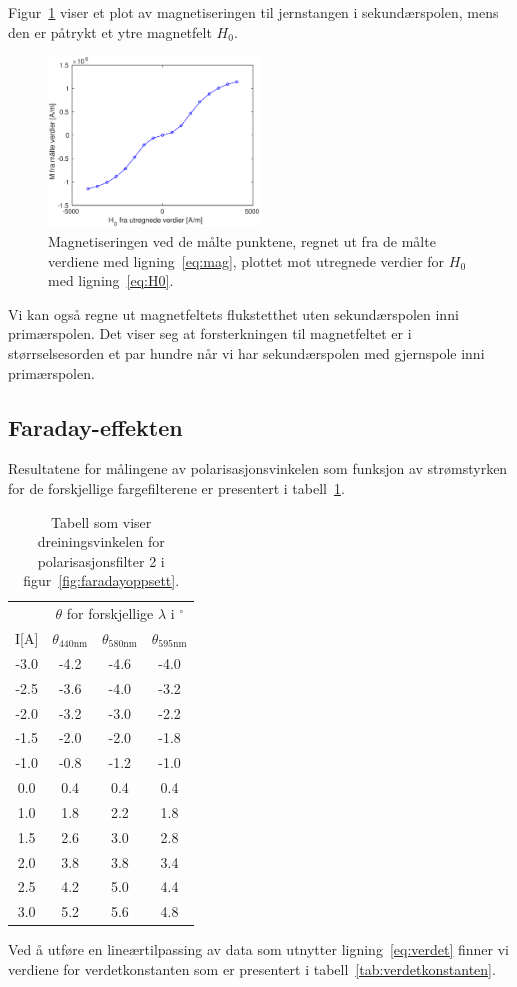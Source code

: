 \documentclass[a4paper,11pt, twocolumn]{article}
\begin{document}
Figur~\ref{fig:maksmag} viser et plot av magnetiseringen til jernstangen i sekundærspolen, mens den er påtrykt et ytre magnetfelt $H_0$. 
\begin{figure}[!ht]
	\centering
	\includegraphics[width=0.5\textwidth]{matlab/magnetisering.eps}
	\caption{Magnetiseringen ved de målte punktene, regnet ut fra de målte verdiene med ligning~\eqref{eq:mag}, plottet mot utregnede verdier for $H_0$ med ligning~\eqref{eq:H0}.}
	\label{fig:maksmag}
\end{figure}
Vi kan også regne ut magnetfeltets flukstetthet uten sekundærspolen inni primærspolen. Det viser seg at forsterkningen til magnetfeltet er i størrselsesorden et par hundre når vi har sekundærspolen med gjernspole inni primærspolen.
\subsection{Faraday-effekten}
Resultatene for målingene av polarisasjonsvinkelen som funksjon av strømstyrken for de forskjellige fargefilterene er presentert i tabell~\ref{tab:verdet}.
\begin{table}
	\centering
	\caption{Tabell som viser dreiningsvinkelen for polarisasjonsfilter 2 i figur~\ref{fig:faradayoppsett}.}
	\begin{tabular}{cccc}
		\toprule
		\toprule
		& \multicolumn{3}{c}{$\theta$ for forskjellige $\lambda$ i $^\circ$} \\
		I[A] & $\theta_{440\text{nm}}$ & $\theta_{580\text{nm}}$ & $\theta_{595\text{nm}}$ \\
		\toprule
		-3.0 &	-4.2&	-4.6&	-4.0 \\
		-2.5&	-3.6&	-4.0&	-3.2 \\
		-2.0&	-3.2&	-3.0&	-2.2 \\
		-1.5&	-2.0&	-2.0&	-1.8 \\
		-1.0&	-0.8&	-1.2&	-1.0 \\
		0.0&	0.4&	0.4&	0.4 \\
		1.0&	1.8&	2.2&	1.8 \\
		1.5&	2.6&	3.0&	2.8 \\
		2.0&	3.8&	3.8&	3.4 \\
		2.5&	4.2&	5.0&	4.4 \\
		3.0&	5.2&	5.6&	4.8 \\
		\toprule
	\end{tabular}
	\label{tab:verdet}
\end{table}
Ved å utføre en lineærtilpassing av data som utnytter ligning~\eqref{eq:verdet} finner vi verdiene for verdetkonstanten som er presentert i tabell~\ref{tab:verdetkonstanten}. 
\end{document}
